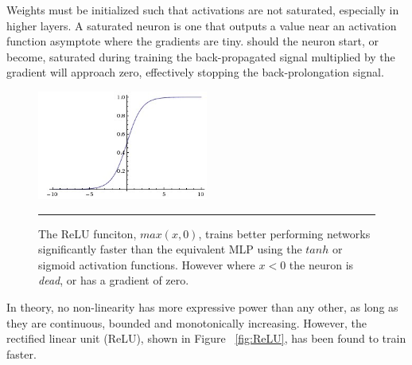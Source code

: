 Weights must be initialized such that activations are not saturated, especially in higher layers.
A saturated neuron is one that outputs a value near an activation function asymptote where the gradients are tiny.
should the neuron start, or become, saturated during training the back-propagated signal multiplied by the gradient will approach zero, effectively stopping the back-prolongation signal\citep{krizhevsky2012imagenet}.
\begin{figure}[htbp]
	\centering
		\includegraphics[width = 0.5\textwidth]{./Figures/sigmoid.jpeg}
		\rule{35em}{0.5pt}
	\caption[The sigmoid]{The ReLU funciton, $max(x,0)$, trains better performing networks significantly faster
	than the equivalent MLP using the $tanh$ or sigmoid activation functions.
	However where $x<0$ the neuron is \textit{dead}, or has a gradient of zero.}
	\label{fig:sigmoid}
\end{figure}


In theory, no non-linearity has more expressive power than any other, as long as they are continuous, bounded and monotonically increasing\citep{hornik1991approximation}.
However, the rectified linear unit (ReLU), shown in Figure ~\ref{fig:ReLU}, has been found to train faster\citep{nair2010rectified}.


